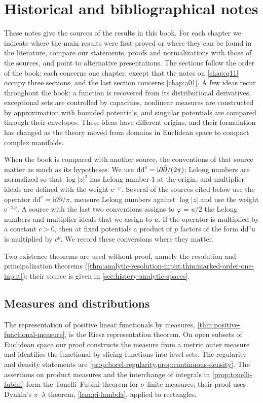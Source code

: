 \chapter{Historical and bibliographical notes}
\label{chap:h01}

These notes give the sources of the results in this book. For each chapter we indicate where the main results were first proved or where they can be found in the literature, compare our statements, proofs and normalizations with those of the sources, and point to alternative presentations. The sections follow the order of the book: each concerns one chapter, except that the notes on \cref{chap:q11} occupy three sections, and the last section concerns \cref{chap:a01}. A few ideas recur throughout the book: a function is recovered from its distributional derivatives, exceptional sets are controlled by capacities, nonlinear measures are constructed by approximation with bounded potentials, and singular potentials are compared through their envelopes. These ideas have different origins, and their formulation has changed as the theory moved from domains in Euclidean space to compact complex manifolds.

When the book is compared with another source, the conventions of that source matter as much as its hypotheses. We use $\mathrm{dd}^{\mathrm{c}}=\mathrm i\partial\bar\partial/(2\pi)$; Lelong numbers are normalized so that $\log|z|^2$ has Lelong number $1$ at the origin, and multiplier ideals are defined with the weight $\mathrm e^{-\varphi}$. Several of the sources cited below use the operator $\mathrm{dd^c}=\mathrm i\partial\bar\partial/\pi$, measure Lelong numbers against $\log|z|$ and use the weight $\mathrm e^{-2\varphi}$. A source with the last two conventions assigns to $\varphi=u/2$ the Lelong numbers and multiplier ideals that we assign to $u$. If the operator is multiplied by a constant $c>0$, then at fixed potentials a product of $p$ factors of the form $\mathrm{dd}^{\mathrm{c}} u$ is multiplied by $c^p$. We record these conversions where they matter.

Two existence theorems are used without proof, namely the resolution and principalization theorems (\cref{thm:analytic-resolution-input,thm:marked-order-one-input}); their source is given in \cref{sec:history-analytic-spaces}.

\section{Measures and distributions}
\label{sec:history-measures}
The representation of positive linear functionals by measures, \cref{thm:positive-functional-measure}, is the Riesz representation theorem. On open subsets of Euclidean space our proof constructs the measure from a metric outer measure and identifies the functional by slicing functions into level sets. The regularity and density statements are \cref{prop:borel-regularity,prop:continuous-density}. The assertions on product measures and the interchange of integrals in \cref{prop:tonelli-fubini} form the Tonelli--Fubini theorem for $\sigma$-finite measures; their proof uses Dynkin's $\pi$--$\lambda$ theorem, \cref{lem:pi-lambda}, applied to rectangles.

